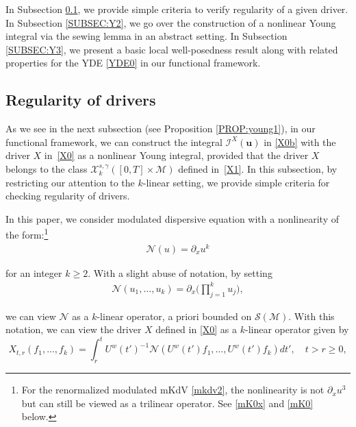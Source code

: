 \documentclass[letterpaper, 11pt,  reqno]{amsart}
\newcommand{\1}{\hspace{0.5mm}\text{I}\hspace{0.5mm}}
\newcommand{\I}{\mathcal{I}}
\newcommand{\noi}{\noindent}
\newcommand{\g}{\gamma}
\newcommand{\dx}{\partial_x}
\renewcommand{\S}{\mathcal{S}}
\newcommand{\M}{\mathcal{M}}
\newcommand{\NN}{\mathcal{N}}
\newcommand{\cX}{\mathcal{X}}
\newcommand{\uw}{U^w}
\newcommand{\uu}{\mathbf{u}}
\numberwithin{equation}{section}
\numberwithin{theorem}{section}
\begin{document}
In Subsection \ref{SUBSEC:Y1}, 
we provide simple criteria
to verify regularity of a given driver.
In 
Subsection \ref{SUBSEC:Y2}, 
we go over the construction of 
a nonlinear Young integral 
via the sewing lemma in an abstract setting.
In 
Subsection \ref{SUBSEC:Y3}, 
we present a basic local well-posedness
result
along with related properties
for the YDE \eqref{YDE0}
in our functional framework.





\subsection{Regularity  of drivers}
\label{SUBSEC:Y1}

As we see in the next subsection (see Proposition \ref{PROP:young1}), 
in our functional framework, 
we can construct the integral $\I^X(\uu)$ in \eqref{X0b}
with the driver $X$ in~\eqref{X0}
as a nonlinear Young integral, 
provided that 
the driver $X$ belongs to the class
 $\cX^{s, \g}_k([0, T]\times \M)$ 
 defined in~\eqref{X1}.
In this subsection, by restricting our attention to the $k$-linear setting, 
we provide
 simple criteria
for checking regularity of drivers.







In this paper, we consider modulated dispersive equation 
with a nonlinearity 
of the form:\footnote{For the renormalized modulated mKdV \eqref{mkdv2}, the nonlinearity is not $\dx u^3$ but can still be viewed as a trilinear operator.
See \eqref{mK0x} and \eqref{mK0} below.}
\begin{align}
\NN(u) = \dx u^k
\label{non0}
\end{align}

\noi
for  an integer $k \ge 2 $.
With a slight abuse of notation, by setting
\begin{align}
\NN(u_1, \dots, u_k) = \dx \bigg(\prod_{j = 1}^k u_j\bigg), 
\label{non1}
\end{align}

\noi
we can view $\NN$ as a $k$-linear operator, 
a priori bounded on $\S(\M)$.
With this notation,  we can view the driver $X$ defined in \eqref{X0}
as a $k$-linear operator given by 
\begin{equation}
X_{t,r}(f_1, \dots, f_k) = \int_r^t \uw(t')^{-1} \NN(\uw(t') f_1, \dots, \uw(t') f_k) dt', \quad 
t > r \ge 0, 
\label{X3}
\end{equation}
\end{document}
